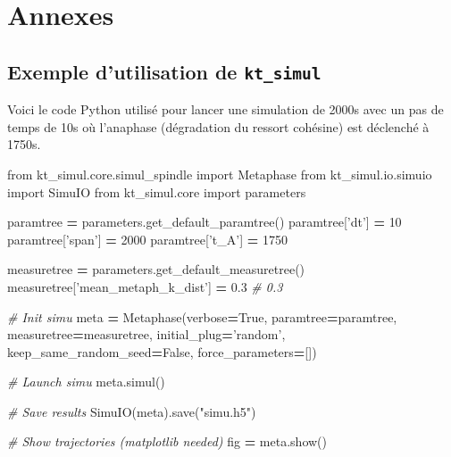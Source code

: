 \documentclass[12pt,a4paper,twoside,openright]{book}
\newenvironment{Shaded}{\begin{snugshade}}{\end{snugshade}}
\newcommand{\DecValTok}[1]{\textcolor[rgb]{0.00,0.00,0.81}{{#1}}}
\newcommand{\FloatTok}[1]{\textcolor[rgb]{0.00,0.00,0.81}{{#1}}}
\newcommand{\StringTok}[1]{\textcolor[rgb]{0.31,0.60,0.02}{{#1}}}
\newcommand{\ImportTok}[1]{{#1}}
\newcommand{\CommentTok}[1]{\textcolor[rgb]{0.56,0.35,0.01}{\textit{{#1}}}}
\newcommand{\VariableTok}[1]{\textcolor[rgb]{0.00,0.00,0.00}{{#1}}}
\newcommand{\OperatorTok}[1]{\textcolor[rgb]{0.81,0.36,0.00}{\textbf{{#1}}}}
\newcommand{\NormalTok}[1]{{#1}}
\begin{document}
\appendix

\chapter{Annexes}\label{annexes}

\section{\texorpdfstring{Exemple d'utilisation de
\texttt{kt\_simul}}{Exemple d'utilisation de kt\_simul}}\label{exemple-dutilisation-de-ktux5fsimul}

\label{sec:ktsimul}

Voici le code Python utilisé pour lancer une simulation de 2000s avec un
pas de temps de 10s où l'anaphase (dégradation du ressort cohésine) est
déclenché à 1750s.

\begin{Shaded}
\begin{Highlighting}[]
\ImportTok{from} \NormalTok{kt_simul.core.simul_spindle }\ImportTok{import} \NormalTok{Metaphase}
\ImportTok{from} \NormalTok{kt_simul.io.simuio }\ImportTok{import} \NormalTok{SimuIO}
\ImportTok{from} \NormalTok{kt_simul.core }\ImportTok{import} \NormalTok{parameters}

\NormalTok{paramtree }\OperatorTok{=} \NormalTok{parameters.get_default_paramtree()}
\NormalTok{paramtree[}\StringTok{'dt'}\NormalTok{] }\OperatorTok{=} \DecValTok{10}
\NormalTok{paramtree[}\StringTok{'span'}\NormalTok{] }\OperatorTok{=} \DecValTok{2000}
\NormalTok{paramtree[}\StringTok{'t_A'}\NormalTok{] }\OperatorTok{=} \DecValTok{1750}

\NormalTok{measuretree }\OperatorTok{=} \NormalTok{parameters.get_default_measuretree()}
\NormalTok{measuretree[}\StringTok{'mean_metaph_k_dist'}\NormalTok{] }\OperatorTok{=} \FloatTok{0.3}  \CommentTok{# 0.3}

\CommentTok{# Init simu}
\NormalTok{meta }\OperatorTok{=} \NormalTok{Metaphase(verbose}\OperatorTok{=}\VariableTok{True}\NormalTok{,}
                 \NormalTok{paramtree}\OperatorTok{=}\NormalTok{paramtree,}
                 \NormalTok{measuretree}\OperatorTok{=}\NormalTok{measuretree,}
                 \NormalTok{initial_plug}\OperatorTok{=}\StringTok{'random'}\NormalTok{,}
                 \NormalTok{keep_same_random_seed}\OperatorTok{=}\VariableTok{False}\NormalTok{,}
                 \NormalTok{force_parameters}\OperatorTok{=}\NormalTok{[])}

\CommentTok{# Launch simu}
\NormalTok{meta.simul()}

\CommentTok{# Save results}
\NormalTok{SimuIO(meta).save(}\StringTok{"simu.h5"}\NormalTok{)}

\CommentTok{# Show trajectories (matplotlib needed)}
\NormalTok{fig }\OperatorTok{=} \NormalTok{meta.show()}
\end{Highlighting}
\end{Shaded}
\end{document}
